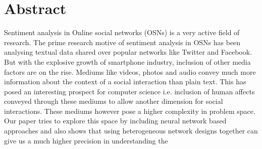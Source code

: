 \section{Abstract}
Sentiment analysis in Online social networks (OSNs) is a very active field of research. The prime research motive of sentiment analysis in OSNs has been analysing textual data shared over popular networks like Twitter and Facebook. But with the explosive growth of smartphone industry, inclusion of other media factors are on the rise. Mediums like videos, photos and audio convey much more information about the context of a social interaction than plain text. This has posed an interesting prospect for computer science i.e. inclusion of human affects conveyed through these mediums to allow another dimension for social interactions. These mediums however pose a higher complexity in problem space. Our paper tries to explore this space by including neural network based approaches and also shows that using heterogeneous network designs together can give us a much higher precision in understanding the 